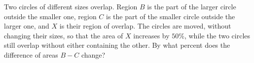 Two circles of different sizes overlap. Region $B$ is the part of the larger circle outside the smaller one, region $C$ is the part of the smaller circle outside the larger one, and $X$ is their region of overlap. The circles are moved, without changing their sizes, so that the area of $X$ increases by $50$\%, while the two circles still overlap without either containing the other. By what percent does the difference of areas $B-C$ change?
